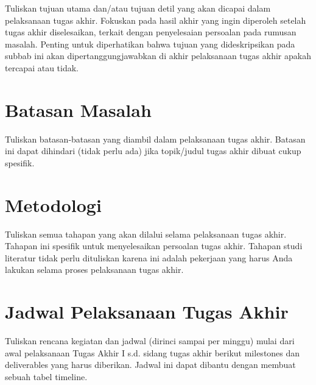 Tuliskan tujuan utama dan/atau tujuan detil yang akan dicapai dalam pelaksanaan tugas akhir. Fokuskan pada hasil akhir yang ingin diperoleh setelah tugas akhir diselesaikan, terkait dengan penyelesaian persoalan pada rumusan masalah. Penting untuk diperhatikan bahwa tujuan yang dideskripsikan pada subbab ini akan dipertanggungjawabkan di akhir pelaksanaan tugas akhir apakah tercapai atau tidak.

\section{Batasan Masalah}

Tuliskan batasan-batasan yang diambil dalam pelaksanaan tugas akhir. Batasan ini dapat dihindari (tidak perlu ada) jika topik/judul tugas akhir dibuat cukup spesifik.

\section{Metodologi}

Tuliskan semua tahapan yang akan dilalui selama pelaksanaan tugas akhir. Tahapan ini spesifik untuk menyelesaikan persoalan tugas akhir. Tahapan studi literatur tidak perlu dituliskan karena ini adalah pekerjaan yang harus Anda lakukan selama proses pelaksanaan tugas akhir.

\section{Jadwal Pelaksanaan Tugas Akhir}

Tuliskan rencana kegiatan dan jadwal (dirinci sampai per minggu) mulai dari awal pelaksanaan Tugas Akhir I s.d. sidang tugas akhir berikut milestones dan deliverables yang harus diberikan. Jadwal ini dapat dibantu dengan membuat sebuah tabel timeline.
